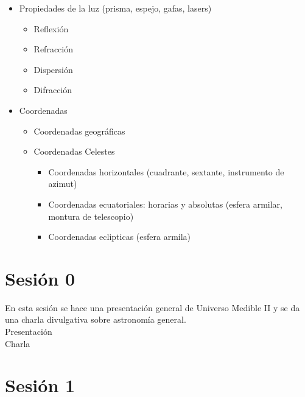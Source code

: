 \documentclass[10pt,a4paper]{article}
\begin{document}
\begin{itemize}
\item Propiedades de la luz (prisma, espejo, gafas, lasers)
 \begin{itemize}
 \item Reflexión
 \item Refracción
 \item Dispersión 
 \item Difracción 
 \end{itemize}
\item Coordenadas 
 \begin{itemize}
  \item Coordenadas geográficas 
  \item Coordenadas Celestes
   \begin{itemize}
    \item Coordenadas horizontales (cuadrante, sextante, instrumento de azimut)
    \item Coordenadas ecuatoriales: horarias y absolutas (esfera armilar, montura de telescopio)
    \item Coordenadas eclipticas  (esfera armila)
   \end{itemize}
 \end{itemize}
\end{itemize}


\section{Sesión 0}
En esta sesión se hace una presentación general de Universo Medible II y se da una charla divulgativa sobre astronomía general. \\ 

Presentación \\
Charla 
\section{Sesión 1}
\end{document}
